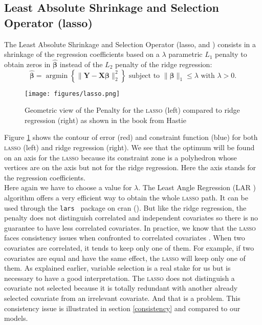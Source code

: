\documentclass[12pt,a4paper]{report}
\begin{document}
		\subsection{Least Absolute Shrinkage and Selection Operator ({\sc lasso})}		%

The Least Absolute Shrinkage and Selection Operator ({\sc lasso}, \cite{tibshirani1996regression} and \cite{tibshiranilasso}) consists in a shrinkage of the regression coefficients based on a $\lambda$ parametric $L_1$ penalty to obtain zeros in $\hat{\boldsymbol{\beta}}$ instead of the $L_2$ penalty of the ridge regression:
		\begin{equation}
		 \boldsymbol{\hat{\beta}}=\operatorname{argmin} \left\lbrace \parallel \boldsymbol{Y}-\boldsymbol{X\beta}\parallel_2^2 \right\rbrace \textrm{ subject to } \parallel\boldsymbol{\beta} \parallel_1\leq \lambda \textrm{ with } \lambda>0 . \nonumber 
		\end{equation}	
		
		\begin{figure}[h!]
			\centering
			\texttt{[image: figures/lasso.png]} 
			\caption{Geometric view of the Penalty for the \textsc{lasso} (left) compared to ridge regression (right) as shown in the book from Hastie \cite{hastie2009elements}} \label{lassogeom}
		\end{figure}
		Figure \ref{lassogeom} shows the contour of error (red) and constraint function (blue) for both \textsc{lasso} (left) and ridge regression (right). We see that the optimum will be found on an axis for the \textsc{lasso} because its constraint zone is a polyhedron whose vertices are on the axis but not for the ridge regression. Here the axis stands for the regression coefficients.\\
		
		Here again we have to choose a value for $\lambda$.
	 The Least Angle Regression (\textsc{LAR} \cite{efron2004least}) algorithm offers a very efficient way to obtain the whole \textsc{lasso} path.  It can be used through the {\tt lars } package on {\sc cran} (\cite{packagelars}). But like the ridge regression, the penalty does not distinguish correlated and independent covariates so there is no guarantee to have less correlated covariates. In practice, we know that the \textsc{lasso} faces consistency issues when confronted to correlated covariates \cite{Zhao2006MSC}. When two covariates are correlated, it tends to keep only one of them. For example, if two covariates are equal and have the same effect, the \textsc{lasso} will keep only one of them. As explained earlier, variable selection is a real stake for us but is necessary to have a good interpretation. The \textsc{lasso} does not distinguish a covariate not selected because it is totally redundant with another already selected covariate from an irrelevant covariate. And that is a problem. This consistency issue is illustrated in section \ref{consistency} and compared to our models.\\
\end{document}
